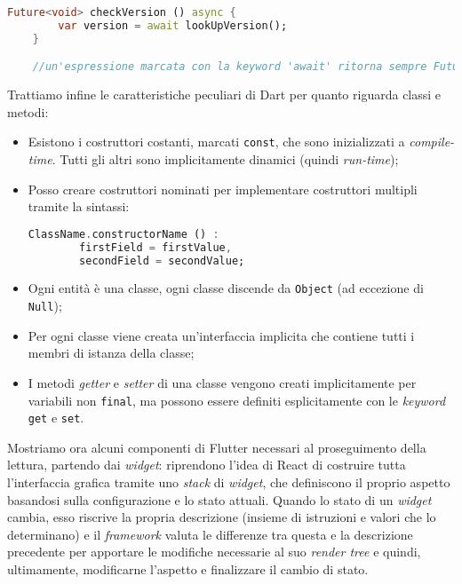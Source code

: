 \begin{lstlisting}[language=dart, firstnumber=1,caption={Dart programmazione asincrona}]
    Future<void> checkVersion () async {
        var version = await lookUpVersion();
    }

    //un'espressione marcata con la keyword 'await' ritorna sempre Future<T>
\end{lstlisting}

Trattiamo infine le caratteristiche peculiari di Dart per quanto riguarda classi e metodi:

\begin{itemize}
    \item Esistono i costruttori costanti, marcati \verb+const+, che sono inizializzati a \textit{compile-time}. Tutti gli altri sono implicitamente dinamici (quindi \textit{run-time});
    \item Posso creare costruttori nominati per implementare costruttori multipli tramite la sintassi:
\begin{lstlisting}[language=dart]
    ClassName.constructorName () :
        firstField = firstValue,
        secondField = secondValue;
\end{lstlisting}
    \item Ogni entità è una classe, ogni classe discende da \verb+Object+ (ad eccezione di \verb+Null+);
    \item Per ogni classe viene creata un'interfaccia implicita che contiene tutti i membri di istanza della classe;
    \item I metodi \textit{getter} e \textit{setter} di una classe vengono creati implicitamente per variabili non \verb+final+, ma possono essere definiti esplicitamente con le \textit{keyword} \verb+get+ e \verb+set+.
\end{itemize}

Mostriamo ora alcuni componenti di Flutter necessari al proseguimento della lettura, partendo dai \textit{widget}: riprendono l'idea di React di costruire tutta l'interfaccia grafica tramite uno \textit{stack} di \textit{widget}, che definiscono il proprio aspetto basandosi sulla configurazione e lo stato attuali. Quando lo stato di un \textit{widget} cambia, esso riscrive la propria descrizione (insieme di istruzioni e valori che lo determinano) e il \textit{framework} valuta le differenze tra questa e la descrizione precedente per apportare le modifiche necessarie al suo \textit{render tree} e quindi, ultimamente, modificarne l'aspetto e finalizzare il cambio di stato.

